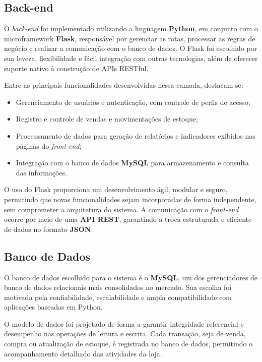 \subsection{Back-end}

O \textit{back-end} foi implementado utilizando a linguagem \textbf{Python}, em conjunto com o microframework \textbf{Flask}, responsável por gerenciar as rotas, processar as regras de negócio e realizar a comunicação com o banco de dados. O Flask foi escolhido por sua leveza, flexibilidade e fácil integração com outras tecnologias, além de oferecer suporte nativo à construção de APIs RESTful.  

Entre as principais funcionalidades desenvolvidas nessa camada, destacam-se:
\begin{itemize}
    \item Gerenciamento de usuários e autenticação, com controle de perfis de acesso;
    \item Registro e controle de vendas e movimentações de estoque;
    \item Processamento de dados para geração de relatórios e indicadores exibidos nas páginas do \textit{front-end};
    \item Integração com o banco de dados \textbf{MySQL} para armazenamento e consulta das informações.
\end{itemize}

O uso do Flask proporciona um desenvolvimento ágil, modular e seguro, permitindo que novas funcionalidades sejam incorporadas de forma independente, sem comprometer a arquitetura do sistema. A comunicação com o \textit{front-end} ocorre por meio de uma \textbf{API REST}, garantindo a troca estruturada e eficiente de dados no formato \textbf{JSON}.


\subsection{Banco de Dados}

O banco de dados escolhido para o sistema é o \textbf{MySQL}, um dos gerenciadores de banco de dados relacionais mais consolidados no mercado. Sua escolha foi motivada pela confiabilidade, escalabilidade e ampla compatibilidade com aplicações baseadas em Python.  

O modelo de dados foi projetado de forma a garantir integridade referencial e desempenho nas operações de leitura e escrita. Cada transação, seja de venda, compra ou atualização de estoque, é registrada no banco de dados, permitindo o acompanhamento detalhado das atividades da loja.  

